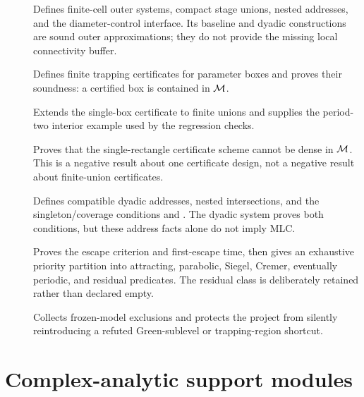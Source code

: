 \begin{description}
\item[]
Defines finite-cell outer systems, compact stage unions, nested addresses,
and the diameter-control interface.  Its baseline and dyadic constructions
are sound outer approximations; they do not provide the missing local
connectivity buffer.

\item[]
Defines finite trapping certificates for parameter boxes and proves their
soundness: a certified box is contained in $\mathcal M$.

\item[]
Extends the single-box certificate to finite unions and supplies the
period-two interior example used by the regression checks.

\item[]
Proves that the single-rectangle certificate scheme cannot be dense in
$\mathcal M$.  This is a negative result about one certificate design, not a
negative result about finite-union certificates.

\item[]
Defines compatible dyadic addresses, nested intersections, and the
singleton/coverage conditions  and .  The dyadic system
proves both conditions, but these address facts alone do not imply MLC.

\item[]
Proves the escape criterion and first-escape time, then gives an exhaustive
priority partition into attracting, parabolic, Siegel, Cremer, eventually
periodic, and residual predicates.  The residual class is deliberately
retained rather than declared empty.

\item[]
Collects frozen-model exclusions and protects the project from silently
reintroducing a refuted Green-sublevel or trapping-region shortcut.
\end{description}

\section{Complex-analytic support modules}

